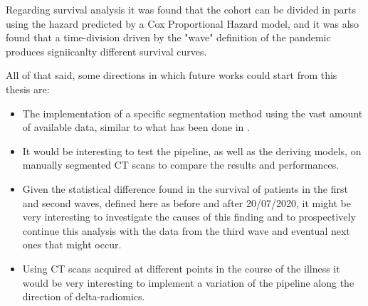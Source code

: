 Regarding survival analysis it was found that the cohort can be divided in parts using the hazard predicted by a Cox Proportional Hazard model, and it was also found that a time-division driven by the "wave" definition of the pandemic produces signiicanlty different survival curves.

All of that said, some directions in which future works could start from this thesis are:

\begin{itemize}
\item The implementation of a \covid specific segmentation method using the vast amount of available data, similar to what has been done in \cite{Biondi}.
\item It would be interesting to test the pipeline, as well as the deriving models, on manually segmented CT scans to compare the results and performances.
\item Given the statistical difference found in the survival of patients in the first and second waves, defined here as before and after 20/07/2020, it might be very interesting to investigate the causes of this finding and to prospectively continue this analysis with the data from the third wave and eventual next ones that might occur.
\item Using CT scans acquired at different points in the course of the illness it would be very interesting to implement a variation of the pipeline along the direction of delta-radiomics.
\end{itemize}
